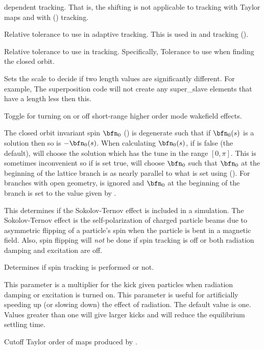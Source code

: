 {\begin{description}
dependent tracking. That is, the shifting is not applicable to tracking with Taylor maps and with
 () tracking.
%
\item[\vn{rel_tol_adaptive_tracking}] \Newline
Relative tolerance to use in adaptive tracking. This is used in  and
 tracking ().
%
\item[\vn{rel_tol_tracking}] \Newline
Relative tolerance to use in tracking. Specifically, Tolerance to use when finding the closed orbit.
%
\item[\vn{significant_length}] \Newline
Sets the scale to decide if two length values are significantly different. For example, The
superposition code will not create any super_slave elements that have a length less then this.
%
\item[\vn{sr_wakes_on}] \Newline
Toggle for turning on or off short-range higher order mode wakefield effects.
%
\item[\vn{spin_n0_direction_user_set}] \Newline
The closed orbit invariant spin $\bfn_0$ () is degenerate such that if $\bfn_0(s)$ is a
solution then so is $-\bfn_0(s)$. When calculating $\bfn_0(s)$, if 
is false (the default), \bmad will choose the solution which has the tune in the range $[0,
\pi]$. This is sometimes inconvenient so if  is set true, \bmad will
choose $\bfn_0$ such that $\bfn_0$ at the beginning of the lattice branch is as nearly parallel to
what is set using  (). For branches with open geometry,
 is ignored and $\bfn_0$ at the beginning of the branch is set to
the value given by .
%
\item[\vn{spin_sokolov_ternov_flipping_on}] \Newline
This determines if the Sokolov-Ternov effect is included in a simulation.  The Sokolov-Ternov
effect\cite{b:barber99} is the self-polarization of charged particle beams due to asymmetric flipping
of a particle's spin when the particle is bent in a magnetic field. Also, spin flipping will {\em
not} be done if spin tracking is off or both radiation damping and excitation are off.
%
\item[\vn{spin_tracking_on}] \Newline
Determines if spin tracking is performed or not.
%
\item[\vn{synch_rad_scale}] \Newline
This parameter is a multiplier for the kick given particles when radiation damping or excitation is
turned on.  This parameter is useful for artificially speeding up (or slowing down) the effect of
radiation.  The default value is one. Values greater than one will give larger kicks and will reduce
the equilibrium settling time.
%
\item[\vn{taylor_order}] \Newline
Cutoff Taylor order of maps produced by .
\end{description}

}
